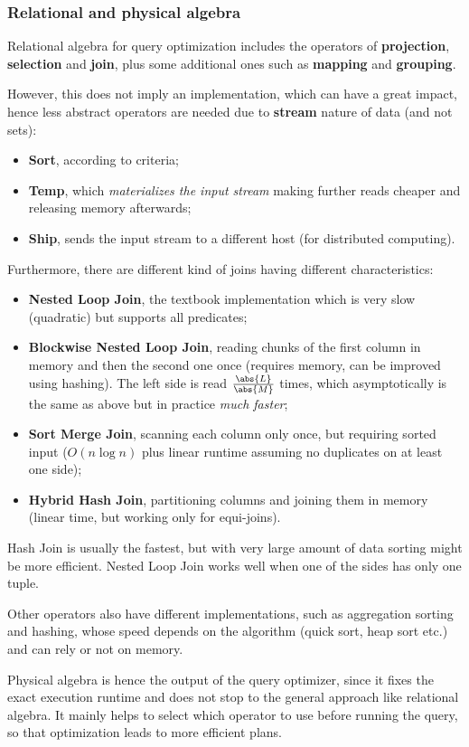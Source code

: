 \subsubsection{Relational and physical algebra}
Relational algebra for query optimization includes the operators of \textbf{projection}, \textbf{selection} and \textbf{join}, plus some additional ones such as \textbf{mapping} and \textbf{grouping}.

However, this does not imply an implementation, which can have a great impact, hence less abstract operators are needed due to \textbf{stream} nature of data (and not sets):
\begin{itemize}
	\item \textbf{Sort}, according to criteria;
	\item \textbf{Temp}, which \textit{materializes the input stream} making further reads cheaper and releasing memory afterwards;
	\item \textbf{Ship}, sends the input stream to a different host (for distributed computing).
\end{itemize}

Furthermore, there are different kind of joins having different characteristics:
\begin{itemize}
	\item \textbf{Nested Loop Join}, the textbook implementation which is very slow (quadratic) but supports all predicates;
	\item \textbf{Blockwise Nested Loop Join}, reading chunks of the first column in memory and then the second one once (requires memory, can be improved using hashing). The left side is read $\frac{\abs{L}}{\abs{M}}$ times, which asymptotically is the same as above but in practice \textit{much faster};
	\item \textbf{Sort Merge Join}, scanning each column only once, but requiring sorted input ($O(n\log n)$ plus linear runtime assuming no duplicates on at least one side);
	\item \textbf{Hybrid Hash Join}, partitioning columns and joining them in memory (linear time, but working only for equi-joins).
\end{itemize}

Hash Join is usually the fastest, but with very large amount of data sorting might be more efficient. Nested Loop Join works well when one of the sides has only one tuple.

Other operators also have different implementations, such as aggregation sorting and hashing, whose speed depends on the algorithm (quick sort, heap sort etc.) and can rely or not on memory.

Physical algebra is hence the output of the query optimizer, since it fixes the exact execution runtime and does not stop to the general approach like relational algebra. It mainly helps to select which operator to use before running the query, so that optimization leads to more efficient plans.

